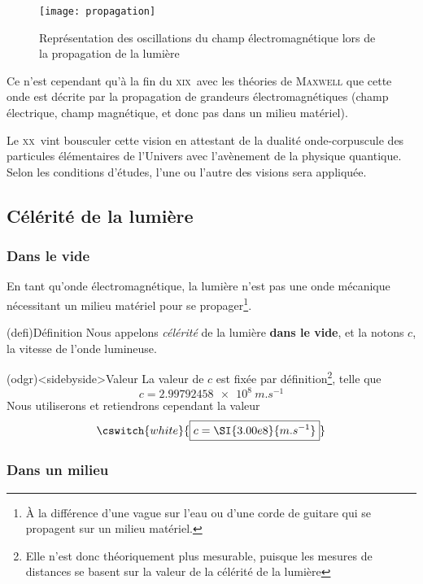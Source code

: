 \documentclass[../../main/main.tex]{subfiles}
\begin{document}
\begin{figure}[h]
	\centering
	\texttt{[image: propagation]}
	\caption{Représentation des oscillations du champ électromagnétique lors de la
		propagation de la lumière}
	\label{fig:proplum}
\end{figure}

Ce n'est cependant qu'à la fin du \textsc{xix}\ieme\ avec les théories
de \textsc{Maxwell} que cette onde est décrite par la propagation de grandeurs
électromagnétiques (champ électrique, champ magnétique, et donc pas dans un
milieu matériel).

Le \textsc{xx}\ieme\ vint bousculer cette vision en attestant de la dualité
onde-corpuscule des particules élémentaires de l'Univers avec l'avènement de la
physique quantique. Selon les conditions d'études, l'une ou l'autre des visions
sera appliquée.

\subsection{Célérité de la lumière}

\subsubsection{Dans le vide}

En tant qu'onde électromagnétique, la lumière n'est pas une onde mécanique
nécessitant un milieu matériel pour se propager\footnote{À la différence d'une
	vague sur l'eau ou d'une corde de guitare qui se propagent sur un milieu
	matériel.}.
\begin{tcb}(defi){Définition}
	Nous appelons \textit{célérité} de la lumière \textbf{dans le vide}, et
	la notons $c$, la vitesse de l'onde lumineuse.
\end{tcb}
\begin{tcb}(odgr)<sidebyside>{Valeur}
	La valeur de $c$ est fixée par définition\footnote{Elle n'est donc
		théoriquement plus mesurable, puisque les mesures de distances se basent sur
		la valeur de la célérité de la lumière}, telle que
	\[c = \SI{2.99792458e8}{m.s^{-1}}\]
	\tcblower
	Nous utiliserons et retiendrons cependant la valeur
	\[
		\cswitch{white}{
			\boxed{c = \SI{3.00e8}{m.s^{-1}}}
		}
	\]
\end{tcb}

\subsubsection{Dans un milieu}
\end{document}
